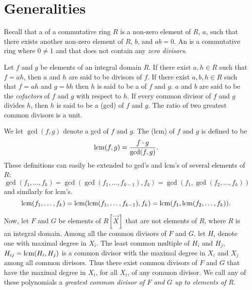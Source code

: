 \section{Generalities}
\label{PRS:Intro:Sec}

Recall that a  of a commutative ring $R$ is a
non-zero element of $R$, $a$, such that there exists another non-zero
element of $R$, $b$, and $ab = 0$.  An  is a
commutative ring where $0 \not= 1$ and that does not contain any {\em
zero divisors}.

Let $f$ and $g$ be elements of an integral domain $R$.  If there
exist $a, h \in R$ such that $f = ah$, then $a$ and $h$ are said to
be divisors of $f$.  If there exist $a, b, h \in R$
such that $f = ah$ and $g = bh$ then $h$ is said to be a  of $f$ and $g$.  $a$ and $b$ are said to be the {\em
cofactors} of $f$ and $g$ with respect to $h$.  If
every common divisor of $f$ and $g$ divides $h$, then $h$ is said to
be a  ({\sc gcd}) of $f$ and $g$.  The
ratio of two greatest common divisors is a unit.

We let $\gcd(f, g)$ denote a {\sc gcd} of $f$ and $g$.  The
 ({\sc lcm}) of $f$ and $g$ is defined to be
\[
\mathop{\rm lcm}\nolimits(f,g) = \frac{f\cdot g}{\gcd(f, g)}.
\]
These definitions can easily be extended to {\sc gcd}'s and {\sc
lcm}'s of several elements of $R$:
\[
\gcd(f_1, \ldots, f_k) = \gcd(\gcd(f_1,\ldots, f_{k-1}), f_k) 
  = \gcd(f_1,\gcd(f_2,\ldots, f_k))
\]
and similarly for {\sc lcm}'s.
\[
\mathop{\rm lcm}\nolimits(f_1, \ldots, f_k) = \mathop{\rm lcm}\nolimits(\mathop{\rm lcm}\nolimits(f_1,\ldots, f_{k-1}), f_k) 
  = \mathop{\rm lcm}\nolimits(f_1,\mathop{\rm lcm}\nolimits(f_2,\ldots, f_k)).
\]

Now, let $F$ and $G$ be elements of $R[\vec{X}]$ that are not elements
of $R$, where $R$ is an integral domain.  Among all the common
divisors of $F$ and $G$, let $H_i$ denote one with maximal degree in
$X_i$.  The least common multiple of $H_i$ and $H_j$, $H_{ij} =
\mathop{\rm lcm}\nolimits(H_i, H_j)$ is a common divisor with the maximal degree in $X_i$
and $X_j$ among all common divisors.  Thus there exist common divisors
of $F$ and $G$ that have the maximal degree in $X_i$, for all $X_i$,
of any common divisor.  We call any of these polynomials a {\em
greatest common divisor of $F$ and $G$ up to elements of
$R$}.

